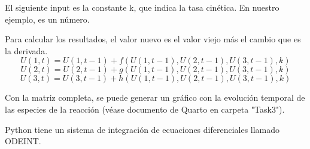 El siguiente input es la constante k, que indica la tasa cinética. En nuestro ejemplo, es un número.

Para calcular los resultados, el valor nuevo es el valor viejo más el cambio que es la derivada. 
$$U(1,t) = U(1, t-1) + f(U(1,t-1), U(2,t-1), U(3,t-1), k)$$ 
$$U(2,t) = U(2, t-1) + g(U(1,t-1), U(2,t-1), U(3,t-1), k)$$ 
$$U(3,t) = U(3, t-1) + h(U(1,t-1), U(2,t-1), U(3,t-1), k)$$ 

Con la matriz completa, se puede generar un gráfico con la evolución temporal de las especies de la reacción (véase documento de Quarto en carpeta "Task3").

Python tiene un sistema de integración de ecuaciones diferenciales llamado ODEINT. 

